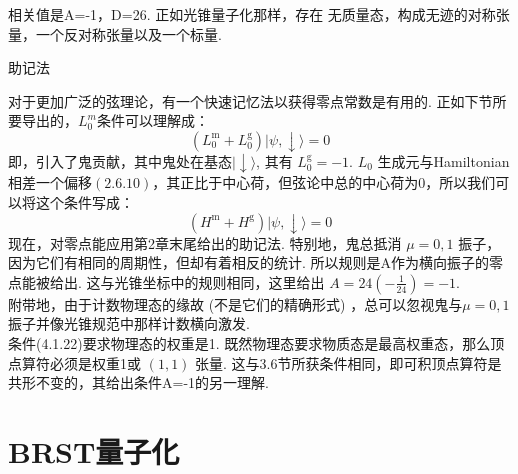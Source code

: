 相关值是A=-1，D=26. 正如光锥量子化那样，存在 无质量态，构成无迹的对称张量，一个反对称张量以及一个标量.\\
\centerline{\Large 助记法}
对于更加广泛的弦理论，有一个快速记忆法以获得零点常数是有用的. 正如下节所要导出的，$L_0^m$条件可以理解成：
\begin{equation}\label{4.1.22}
\left(L_{0}^{\mathrm{m}}+L_{0}^{\mathrm{g}}\right)|\psi, \downarrow\rangle=0
\end{equation}
即，引入了鬼贡献，其中鬼处在基态$|\downarrow\rangle$, 其有 $L_{0}^{\mathrm{g}}=-1$.  $L_{0}$ 生成元与Hamiltonian相差一个偏移$(2.6 .10)$，其正比于中心荷，但弦论中总的中心荷为0，所以我们可以将这个条件写成：
\begin{equation}
\left(H^{\mathrm{m}}+H^{\mathrm{g}}\right)|\psi, \downarrow\rangle=0
\end{equation}
现在，对零点能应用第2章末尾给出的助记法. 特别地，鬼总抵消 $\mu=0,1$ 振子，因为它们有相同的周期性，但却有着相反的统计. 所以规则是A作为横向振子的零点能被给出. 这与光锥坐标中的规则相同，这里给出 $A=24\left(-\frac{1}{24}\right)=-1$.\\
附带地，由于计数物理态的缘故 (不是它们的精确形式) ，总可以忽视鬼与$\mu=0,1$ 振子并像光锥规范中那样计数横向激发.\\
条件(4.1.22)要求物理态的权重是1. 既然物理态要求物质态是最高权重态，那么顶点算符必须是权重1或 $(1,1)$ 张量. 这与3.6节所获条件相同，即可积顶点算符是共形不变的，其给出条件A=-1的另一理解.\\

\section{BRST量子化}%

